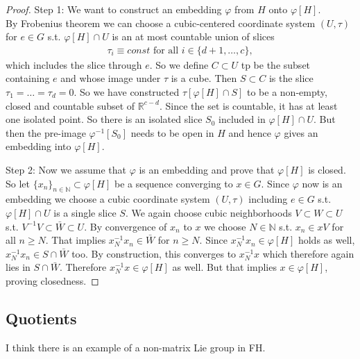 \begin{proof}
Step 1: We want to construct an embedding $\varphi$ from $H$ onto $\varphi[H]$.\\
By Frobenius theorem we can choose a cubic-centered coordinate system $(U,\tau)$ for $e \in G$ s.t. $\varphi[H]\cap U$ is an at most countable union of slices 
\begin{align*}
\tau_i \equiv const \text{ for all } i \in \{d+1,\dots,c\},
\end{align*} 
which includes the slice through $e$. So we define $C \subset U$ tp be the subset containing $e$ and whose image under $\tau$ is a cube. Then $S \subset C$ is the slice $\tau_1 = \dots = \tau_d = 0$. So we have constructed $\tau[\varphi[H]\cap S]$ to be a non-empty, closed and countable subset of $\mathbb{R}^{c-d}$. Since the set is countable, it has at least one isolated point. So there is an isolated slice $S_0$ included in $\varphi[H]\cap U$. But then the pre-image $\varphi^{-1}[S_0]$ needs to be open in $H$ and hence $\varphi$ gives an embedding into $\varphi[H]$.


Step 2: Now we assume that $\varphi$ is an embedding and prove that $\varphi[H]$ is closed. \\
So let $\{x_n\}_{n \in \mathbb{N}} \subset \varphi[H]$ be a sequence converging to $x \in G$. Since $\varphi$ now is an embedding we choose a cubic coordinate system $(U,\tau)$ including $e \in G$ s.t. $\varphi[H] \cap U$ is a single slice $S$. We again choose cubic neighborhoods $V \subset W \subset U$ s.t. $V^{-1}V \subset \bar{W} \subset U$. By convergence of $x_n$ to $x$ we choose $N \in \mathbb{N}$ s.t. $x_n \in xV$ for all $n \geq N$. That implies $x_N^{-1}x_n \in \bar{W}$ for $n \geq N$. Since $x_N^{-1}x_n \in \varphi[H]$ holds as well, $x_N^{-1}x_n \in S \cap \bar{W}$ too. By construction, this converges to $x_N^{-1}x$ which therefore again lies in $S \cap \bar{W}$. Therefore $x_N^{-1}x \in \varphi[H]$ as well. But that implies $x \in \varphi[H]$, proving closedness.

\end{proof}

\subsection{Quotients}

I think there is an example of a non-matrix Lie group in FH.

